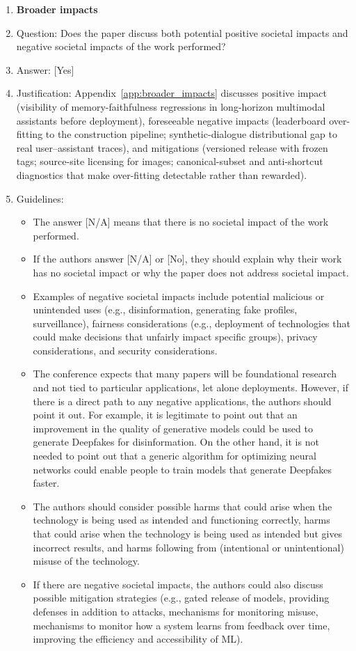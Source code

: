 \documentclass{llmxive}
\providecommand{\answerYes}[1][]{[Yes]#1}
\providecommand{\answerNo}[1][]{[No]#1}
\providecommand{\answerNA}[1][]{[N/A]#1}
\begin{document}
\begin{enumerate}
\item {\bf Broader impacts}
    \item[] Question: Does the paper discuss both potential positive societal impacts and negative societal impacts of the work performed?
    \item[] Answer: \answerYes{}
    \item[] Justification: Appendix~\ref{app:broader_impacts} discusses positive impact (visibility of memory-faithfulness regressions in long-horizon multimodal assistants before deployment), foreseeable negative impacts (leaderboard over-fitting to the construction pipeline; synthetic-dialogue distributional gap to real user--assistant traces), and mitigations (versioned release with frozen tags; source-site licensing for images; canonical-subset and anti-shortcut diagnostics that make over-fitting detectable rather than rewarded).
    \item[] Guidelines:
    \begin{itemize}
        \item The answer \answerNA{} means that there is no societal impact of the work performed.
        \item If the authors answer \answerNA{} or \answerNo, they should explain why their work has no societal impact or why the paper does not address societal impact.
        \item Examples of negative societal impacts include potential malicious or unintended uses (e.g., disinformation, generating fake profiles, surveillance), fairness considerations (e.g., deployment of technologies that could make decisions that unfairly impact specific groups), privacy considerations, and security considerations.
        \item The conference expects that many papers will be foundational research and not tied to particular applications, let alone deployments. However, if there is a direct path to any negative applications, the authors should point it out. For example, it is legitimate to point out that an improvement in the quality of generative models could be used to generate Deepfakes for disinformation. On the other hand, it is not needed to point out that a generic algorithm for optimizing neural networks could enable people to train models that generate Deepfakes faster.
        \item The authors should consider possible harms that could arise when the technology is being used as intended and functioning correctly, harms that could arise when the technology is being used as intended but gives incorrect results, and harms following from (intentional or unintentional) misuse of the technology.
        \item If there are negative societal impacts, the authors could also discuss possible mitigation strategies (e.g., gated release of models, providing defenses in addition to attacks, mechanisms for monitoring misuse, mechanisms to monitor how a system learns from feedback over time, improving the efficiency and accessibility of ML).
    \end{itemize}


\end{enumerate}
\end{document}
